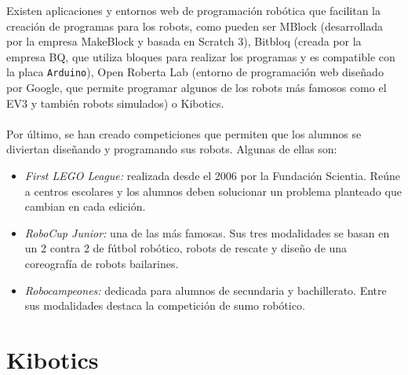 \documentclass{report}
\begin{document}
Existen aplicaciones y entornos web de programación robótica que facilitan la creación de programas para los robots, como pueden ser MBlock (desarrollada por la empresa MakeBlock y basada en Scratch 3), Bitbloq (creada por la empresa BQ, que utiliza bloques para realizar los programas y es compatible con la placa \texttt{Arduino}), Open Roberta Lab (entorno de programación web diseñado por Google, que permite programar algunos de los robots más famosos como el EV3 y también robots simulados) o Kibotics.
\\
\\
Por último, se han creado competiciones que permiten que los alumnos se diviertan diseñando y programando sus robots. Algunas de ellas son:
\begin{itemize}
	\item \textit{First LEGO League:} realizada desde el 2006 por la Fundación Scientia. Reúne a centros escolares y los alumnos deben solucionar un problema planteado que cambian en cada edición.

	\item \textit{RoboCup Junior:} una de las más famosas. Sus tres modalidades se basan en un 2 contra 2 de fútbol robótico, robots de rescate y diseño de una coreografía de robots bailarines.
		
	\item \textit{Robocampeones:} dedicada para alumnos de secundaria y bachillerato. Entre sus modalidades destaca la competición de sumo robótico.
	
\end{itemize}



\section{Kibotics}
\end{document}

